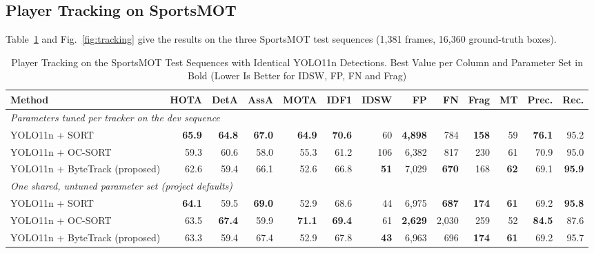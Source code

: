 \documentclass[conference]{IEEEtran}
\begin{document}
\subsection{Player Tracking on SportsMOT}
Table~\ref{tab:sportsmot} and Fig.~\ref{fig:tracking} give the results on the
three SportsMOT test sequences (1,381 frames, 16,360 ground-truth boxes).

\begin{table}[t]
\caption{Player Tracking on the SportsMOT Test Sequences with Identical YOLO11n
Detections. Best Value per Column and Parameter Set in Bold (Lower Is Better for
IDSW, FP, FN and Frag)}
\label{tab:sportsmot}
\centering
\footnotesize
\setlength{\tabcolsep}{5pt}
\begin{adjustbox}{max width=\textwidth}
\begin{tabular}{@{}lrrrrrrrrrrrr@{}}
\toprule
Method & HOTA & DetA & AssA & MOTA & IDF1 & IDSW & FP & FN & Frag & MT & Prec. & Rec. \\
\midrule
\multicolumn{13}{l}{\textit{Parameters tuned per tracker on the dev sequence}} \\
YOLO11n + SORT & \textbf{65.9} & \textbf{64.8} & \textbf{67.0} & \textbf{64.9} & \textbf{70.6} & 60 & \textbf{4{,}898} & 784 & \textbf{158} & 59 & \textbf{76.1} & 95.2 \\
YOLO11n + OC-SORT & 59.3 & 60.6 & 58.0 & 55.3 & 61.2 & 106 & 6{,}382 & 817 & 230 & 61 & 70.9 & 95.0 \\
YOLO11n + ByteTrack (proposed) & 62.6 & 59.4 & 66.1 & 52.6 & 66.8 & \textbf{51} & 7{,}029 & \textbf{670} & 168 & \textbf{62} & 69.1 & \textbf{95.9} \\
\midrule
\multicolumn{13}{l}{\textit{One shared, untuned parameter set (project defaults)}} \\
YOLO11n + SORT & \textbf{64.1} & 59.5 & \textbf{69.0} & 52.9 & 68.6 & 44 & 6{,}975 & \textbf{687} & \textbf{174} & \textbf{61} & 69.2 & \textbf{95.8} \\
YOLO11n + OC-SORT & 63.5 & \textbf{67.4} & 59.9 & \textbf{71.1} & \textbf{69.4} & 61 & \textbf{2{,}629} & 2{,}030 & 259 & 52 & \textbf{84.5} & 87.6 \\
YOLO11n + ByteTrack (proposed) & 63.3 & 59.4 & 67.4 & 52.9 & 67.8 & \textbf{43} & 6{,}963 & 696 & \textbf{174} & \textbf{61} & 69.2 & 95.7 \\
\bottomrule
\end{tabular}
\end{adjustbox}
\end{table}
\end{document}
